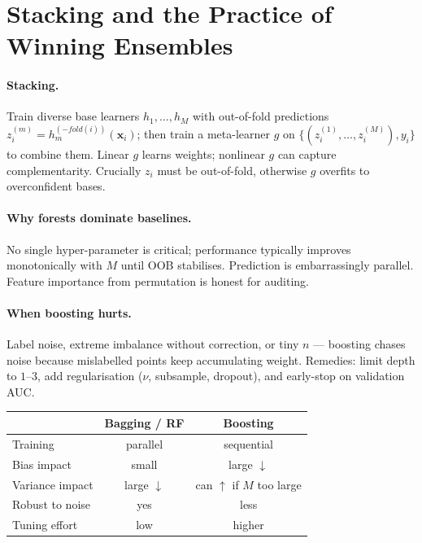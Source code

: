 \section{Stacking and the Practice of Winning Ensembles}
\label{sec:stacking}
\paragraph{Stacking.} Train diverse base learners $h_1,\dots,h_M$ with out-of-fold predictions $z_i^{(m)}=h_m^{(-fold(i))}(\mathbf{x}_i)$; then train a meta-learner $g$ on $\{(z_i^{(1)},\dots,z_i^{(M)}), y_i\}$ to combine them. Linear $g$ learns weights; nonlinear $g$ can capture complementarity. Crucially $z_i$ must be out-of-fold, otherwise $g$ overfits to overconfident bases.

\paragraph{Why forests dominate baselines.} No single hyper-parameter is critical; performance typically improves monotonically with $M$ until OOB stabilises. Prediction is embarrassingly parallel. Feature importance from permutation is honest for auditing.

\paragraph{When boosting hurts.} Label noise, extreme imbalance without correction, or tiny $n$ --- boosting chases noise because mislabelled points keep accumulating weight. Remedies: limit depth to $1$--$3$, add regularisation ($\nu$, subsample, dropout), and early-stop on validation AUC.

\begin{center}\small
\begin{tabular}{lcc}
\toprule
 & Bagging / RF & Boosting \\
\midrule
Training & parallel & sequential \\
Bias impact & small & large $\downarrow$ \\
Variance impact & large $\downarrow$ & can $\uparrow$ if $M$ too large \\
Robust to noise & yes & less \\
Tuning effort & low & higher \\
\bottomrule
\end{tabular}
\end{center}

